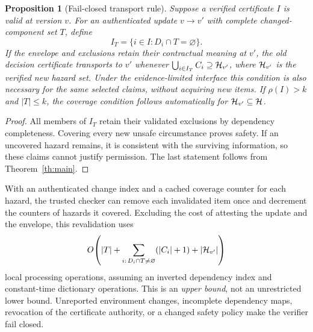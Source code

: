 \documentclass[11pt]{article}
\newtheorem{proposition}[theorem]{Proposition}
\begin{document}
\begin{proposition}[Fail-closed transport rule]\label{prop:transport}
Suppose a verified certificate $I$ is valid at version $v$. For an authenticated update $v\to v'$ with complete changed-component set $T$, define
\[
I_T=\{i\in I:D_i\cap T=\varnothing\}.
\]
If the envelope and exclusions retain their contractual meaning at $v'$, the old decision certificate transports to $v'$ whenever $\bigcup_{i\in I_T}C_i\supseteq\mathcal H_{v'}$, where $\mathcal H_{v'}$ is the verified new hazard set. Under the evidence-limited interface this condition is also necessary for the \emph{same selected claims}, without acquiring new items. If $\rho(I)>k$ and $|T|\le k$, the coverage condition follows automatically for $\mathcal H_{v'}\subseteq\mathcal H$.
\end{proposition}
\begin{proof}
All members of $I_T$ retain their validated exclusions by dependency completeness. Covering every new unsafe circumstance proves safety. If an uncovered hazard remains, it is consistent with the surviving information, so these claims cannot justify permission. The last statement follows from Theorem~\ref{th:main}.\end{proof}

With an authenticated change index and a cached coverage counter for each hazard, the trusted checker can remove each invalidated item once and decrement the counters of hazards it covered. Excluding the cost of attesting the update and the envelope, this revalidation uses
\[
O\!\left(|T|+\sum_{i:\,D_i\cap T\ne\varnothing}(|C_i|+1)+|\mathcal H_{v'}|\right)
\]
local processing operations, assuming an inverted dependency index and constant-time dictionary operations. This is an \emph{upper bound}, not an unrestricted lower bound. Unreported environment changes, incomplete dependency maps, revocation of the certificate authority, or a changed safety policy make the verifier fail closed.
\end{document}
